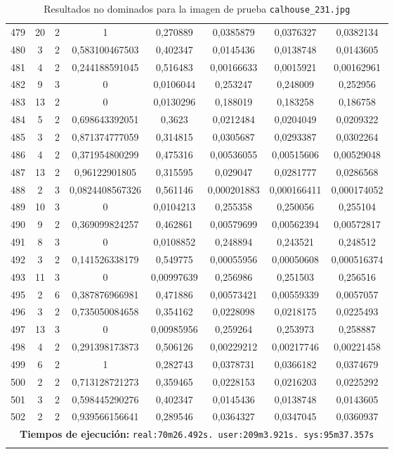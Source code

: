 \begin{longtable}{|c|c|c|c|c|c|c|c|}
479 & 20 & 2 & 1 & 0,270889 & 0,0385879 & 0,0376327 & 0,0382134  \\
480 & 3 & 2 & 0,583100467503 & 0,402347 & 0,0145436 & 0,0138748 & 0,0143605  \\
481 & 4 & 2 & 0,244188591045 & 0,516483 & 0,00166633 & 0,0015921 & 0,00162961  \\
482 & 9 & 3 & 0 & 0,0106044 & 0,253247 & 0,248009 & 0,252956  \\
483 & 13 & 2 & 0 & 0,0130296 & 0,188019 & 0,183258 & 0,186758  \\
484 & 5 & 2 & 0,698643392051 & 0,3623 & 0,0212484 & 0,0204049 & 0,0209322  \\
485 & 3 & 2 & 0,871374777059 & 0,314815 & 0,0305687 & 0,0293387 & 0,0302264  \\
486 & 4 & 2 & 0,371954800299 & 0,475316 & 0,00536055 & 0,00515606 & 0,00529048  \\
487 & 13 & 2 & 0,96122901805 & 0,315595 & 0,029047 & 0,0281777 & 0,0286568  \\
488 & 2 & 3 & 0,0824408567326 & 0,561146 & 0,000201883 & 0,000166411 & 0,000174052  \\
489 & 10 & 3 & 0 & 0,0104213 & 0,255358 & 0,250056 & 0,255104  \\
490 & 9 & 2 & 0,369099824257 & 0,462861 & 0,00579699 & 0,00562394 & 0,00572817  \\
491 & 8 & 3 & 0 & 0,0108852 & 0,248894 & 0,243521 & 0,248512  \\
492 & 3 & 2 & 0,141526338179 & 0,549775 & 0,00055956 & 0,00050608 & 0,000516374  \\
493 & 11 & 3 & 0 & 0,00997639 & 0,256986 & 0,251503 & 0,256516  \\
495 & 2 & 6 & 0,387876966981 & 0,471886 & 0,00573421 & 0,00559339 & 0,0057057  \\
496 & 3 & 2 & 0,735050084658 & 0,354162 & 0,0228098 & 0,0218175 & 0,0225493  \\
497 & 13 & 3 & 0 & 0,00985956 & 0,259264 & 0,253973 & 0,258887  \\
498 & 4 & 2 & 0,291398173873 & 0,506126 & 0,00229212 & 0,00217746 & 0,00221458  \\
499 & 6 & 2 & 1 & 0,282743 & 0,0378731 & 0,0366182 & 0,0374679  \\
500 & 2 & 2 & 0,713128721273 & 0,359465 & 0,0228153 & 0,0216203 & 0,0225292  \\
501 & 3 & 2 & 0,598445290276 & 0,402347 & 0,0145436 & 0,0138748 & 0,0143605  \\
502 & 2 & 2 & 0,939566156641 & 0,289546 & 0,0364327 & 0,0347045 & 0,0360937  \\
\hline
\multicolumn{8}{|c|}{\textbf{Tiempos de ejecución:} \texttt{real:70m26.492s. user:209m3.921s. sys:95m37.357s}}\\  \hline
\caption{Resultados no dominados para la imagen de prueba \texttt{calhouse\_231.jpg}}
\label{tab:calhouse_231}
\end{longtable}
\normalsize

